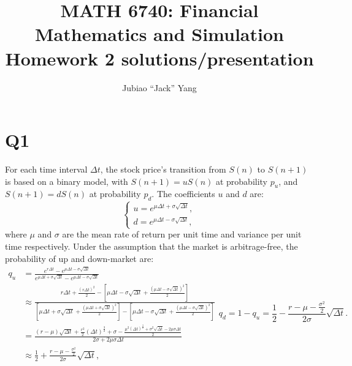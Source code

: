 \documentclass[final,3p,times]{elsarticle}
\begin{document}
\begin{frontmatter}

\title{MATH 6740: Financial Mathematics and Simulation\\
	Homework 2 solutions/presentation}

\author[rvt]{Jubiao ``Jack'' Yang}

\address[rvt]{Rensselaer Polytechnic Institute, Troy, NY 12180}


\end{frontmatter}

\section{Q1}
	For each time interval $\Delta t$, the stock price's transition from $S(n)$ to $S(n+1)$ is based on a binary model, with $S(n+1)=uS(n)$ at probability $p_u$, and $S(n+1)=dS(n)$ at probability $p_d$. The coefficients $u$ and $d$ are:
	\begin{equation}
		\begin{cases}
			u=e^{\mu \Delta t + \sigma \sqrt{\Delta t}} ,\\
			d=e^{\mu \Delta t - \sigma \sqrt{\Delta t}} ,
		\end{cases}
	\end{equation}
	where $\mu$ and $\sigma$ are the mean rate of return per unit time and variance per unit time respectively. Under the assumption that the market is arbitrage-free, the probability of up and down-market are:
	\begin{subequations}
		\begin{equation}
			\begin{split}
				q_u &= \frac{e^{r\Delta t}-e^{\mu \Delta t - \sigma \sqrt{\Delta t}}}{e^{\mu \Delta t + \sigma \sqrt{\Delta t}} - e^{\mu \Delta t - \sigma \sqrt{\Delta t}}} \\
				&\approx \frac{r\Delta t + \frac{\left(r\Delta t\right)^2}{2}-\left[\mu\Delta t - \sigma\sqrt{\Delta t} + \frac{\left(\mu\Delta t - \sigma\sqrt{\Delta t}\right)^2}{2}\right]}{\left[\mu\Delta t + \sigma\sqrt{\Delta t} + \frac{\left(\mu\Delta t + \sigma\sqrt{\Delta t}\right)^2}{2}\right] - \left[\mu\Delta t - \sigma\sqrt{\Delta t} + \frac{\left(\mu\Delta t - \sigma\sqrt{\Delta t}\right)^2}{2}\right]} \\
				&= \frac{\left(r-\mu\right)\sqrt{\Delta t}+\frac{r^2}{2}\left(\Delta t\right)^{\frac{3}{2}} + \sigma - \frac{\mu^2\left(\Delta t\right)^{\frac{3}{2}} + \sigma^2 \sqrt{\Delta t} - 2\mu\sigma \Delta t }{2} }{2\sigma + 2\mu\sigma\Delta t} \\
				&\approx \frac{1}{2} + \frac{r-\mu-\frac{\sigma^2}{2}}{2\sigma} \sqrt{\Delta t}
				,
			\end{split}
		\end{equation}
		\begin{equation}
			q_d = 1 - q_u = \frac{1}{2} - \frac{r-\mu-\frac{\sigma^2}{2}}{2\sigma} \sqrt{\Delta t}
			.
		\end{equation}
	\end{subequations}
\end{document}
